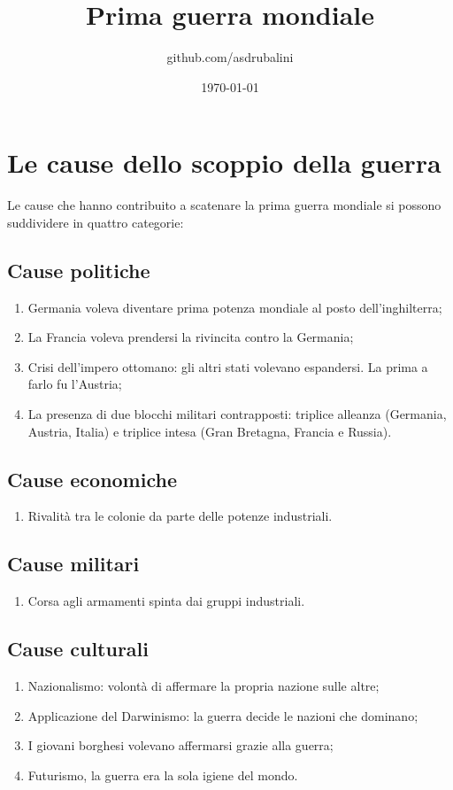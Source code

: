\documentclass{article}
\title{Prima guerra mondiale}
\author{github.com/asdrubalini}
\date{\today}
\begin{document}
\maketitle

\section{Le cause dello scoppio della guerra}
Le cause che hanno contribuito a scatenare la prima guerra mondiale si possono suddividere in quattro categorie:

\subsection{Cause politiche}
\begin{enumerate}
    \item Germania voleva diventare prima potenza mondiale al posto dell'inghilterra;
    \item La Francia voleva prendersi la rivincita contro la Germania;
    \item Crisi dell'impero ottomano: gli altri stati volevano espandersi. La prima a farlo fu l'Austria;
    \item La presenza di due blocchi militari contrapposti: triplice alleanza (Germania, Austria, Italia) e triplice intesa (Gran Bretagna, Francia e Russia).
\end{enumerate}

\subsection{Cause economiche}
\begin{enumerate}
    \item Rivalità tra le colonie da parte delle potenze industriali.
\end{enumerate}

\subsection{Cause militari}
\begin{enumerate}
    \item Corsa agli armamenti spinta dai gruppi industriali.
\end{enumerate}

\subsection{Cause culturali}
\begin{enumerate}
    \item Nazionalismo: volontà di affermare la propria nazione sulle altre;
    \item Applicazione del Darwinismo: la guerra decide le nazioni che dominano;
    \item I giovani borghesi volevano affermarsi grazie alla guerra;
    \item Futurismo, la guerra era la sola igiene del mondo.
\end{enumerate}
\end{document}
